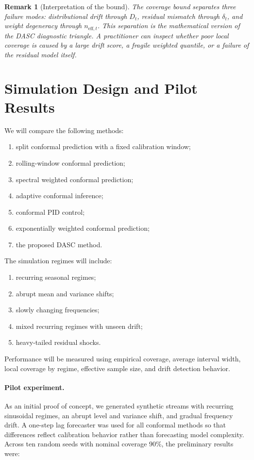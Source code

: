 \documentclass[11pt]{article}
\newtheorem{remark}{Remark}
\begin{document}
\begin{remark}[Interpretation of the bound]
The coverage bound separates three failure modes: distributional drift through $D_t$, residual mismatch through $\delta_t$, and weight degeneracy through $n_{\mathrm{eff},t}$. This separation is the mathematical version of the DASC diagnostic triangle. A practitioner can inspect whether poor local coverage is caused by a large drift score, a fragile weighted quantile, or a failure of the residual model itself.
\end{remark}

\section{Simulation Design and Pilot Results}

We will compare the following methods:
\begin{enumerate}[label=(\roman*)]
    \item split conformal prediction with a fixed calibration window;
    \item rolling-window conformal prediction;
    \item spectral weighted conformal prediction;
    \item adaptive conformal inference;
    \item conformal PID control;
    \item exponentially weighted conformal prediction;
    \item the proposed DASC method.
\end{enumerate}

The simulation regimes will include:
\begin{enumerate}[label=(\alph*)]
    \item recurring seasonal regimes;
    \item abrupt mean and variance shifts;
    \item slowly changing frequencies;
    \item mixed recurring regimes with unseen drift;
    \item heavy-tailed residual shocks.
\end{enumerate}

Performance will be measured using empirical coverage, average interval width, local coverage by regime, effective sample size, and drift detection behavior.

\paragraph{Pilot experiment.}
As an initial proof of concept, we generated synthetic streams with recurring sinusoidal regimes, an abrupt level and variance shift, and gradual frequency drift. A one-step lag forecaster was used for all conformal methods so that differences reflect calibration behavior rather than forecasting model complexity. Across ten random seeds with nominal coverage $90\%$, the preliminary results were:
\end{document}

